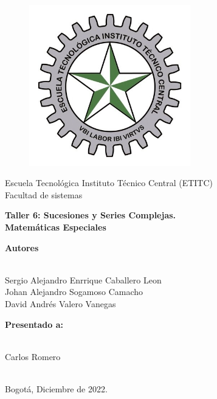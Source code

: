 \documentclass[a4paper,11pt,openany]{book}
\begin{document}
\begin{titlepage}
 
\begin{center}
\vspace*{-1in}
\begin{figure}[htb]
\begin{center}
\includegraphics[width=7cm]{ETITC.png}
\end{center}
\end{figure}
 
 
{\sc \huge Escuela Tecnológica Instituto Técnico Central (ETITC)}\\
\vspace*{0.15in}
Facultad de sistemas\\
\vspace*{0.6in}
\begin{Large}
\textbf{Taller 6: Sucesiones y Series Complejas.} \\
\textbf{Matem{\'a}ticas Especiales}\\
\end{Large}
\vspace*{0.3in}
\begin{large}
{\bf Autores} \\
 
\ 
 
Sergio Alejandro Enrrique Caballero Leon\\ 
Johan Alejandro Sogamoso Camacho \\
David Andrés Valero Vanegas \\
\end{large}
\vspace*{0.3in}
 
\end{center}
 
\begin{center}
{\bf Presentado a:} \\
 
\ 
 
Carlos Romero \\
 
\
 
Bogot{\'a}, Diciembre de 2022.
\end{center}
 
\end{titlepage}
\end{document}
